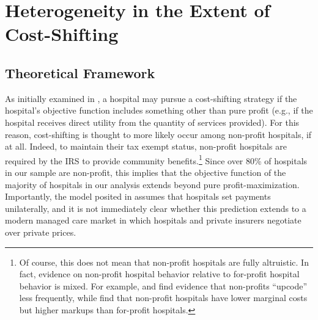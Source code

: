 \documentclass[12pt]{article}
\begin{document}
\section{Heterogeneity in the Extent of Cost-Shifting}
\label{sec:Ext}

\subsection{Theoretical Framework}
As initially examined in \cite{dranove1988}, a hospital may pursue a cost-shifting strategy if the hospital's objective function includes something other than pure profit (e.g., if the hospital receives direct utility from the quantity of services provided). For this reason, cost-shifting is thought to more likely occur among non-profit hospitals, if at all. Indeed, to maintain their tax exempt status, non-profit hospitals are required by the IRS to provide community benefits.\footnote{Of course, this does not mean that non-profit hospitals are fully altruistic. In fact, evidence on non-profit hospital behavior relative to for-profit hospital behavior is mixed. For example, \cite{silverman2004} and \cite{dafny2005} find evidence that non-profits ``upcode'' less frequently, while \cite{gaynor2003} find that non-profit hospitals have lower marginal costs but higher markups than for-profit hospitals.} Since over 80\% of hospitals in our sample are non-profit, this implies that the objective function of the majority of hospitals in our analysis extends beyond pure profit-maximization.  Importantly, the model posited in \cite{dranove1988} assumes that hospitals set payments unilaterally, and it is not immediately clear whether this prediction extends to a modern managed care market in which hospitals and private insurers negotiate over private prices.
\end{document}
